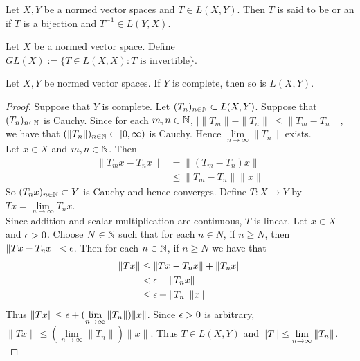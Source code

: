 \documentclass{book}
\begin{document}
	\begin{defn} 
		Let $X,Y$ be a normed vector spaces and $T \in L(X,Y)$. Then $T$ is said to be  or an  if $T$ is a bijection and $T^{-1} \in L(Y,X)$.
	\end{defn}
	
	\begin{defn} 
		Let $X$ be a normed vector space. Define $GL(X) := \{T \in L(X,X): T \text{ is invertible}\}$.
	\end{defn}
	
	\begin{ex} 
		Let $X,Y$ be normed vector spaces. If $Y$ is complete, then so is $L(X,Y)$.
	\end{ex}
	
	\begin{proof}
		Suppose that $Y$ is complete. Let $(T_n)_{n \in \mathbb{N}} \subset L(X,Y)$. Suppose that $(T_n)_{n \in \mathbb{N}}$ is Cauchy. Since for each $m,n \in \mathbb{N}$, $\big\vert \|T_m \|- \|T_n \|\big\vert \leq \|T_m -T_n \|$, we have that $(\|T_n \|)_{n \in \mathbb{N}} \subset [0,\infty)$ is Cauchy. Hence $\lim\limits_{n \rightarrow \infty}\|T_n \|$ exists. \vspace{1cm} \\ Let $x \in X$ and $m,n \in \mathbb{N}$. Then 
		\begin{align*}
			\|T_m x - T_n x \|
			&= \|(T_m-T_n) x \|\\
			&\leq \|T_m-T_n \|\|x \|
		\end{align*}
		So $(T_nx)_{n \in \mathbb{N}} \subset Y$ is Cauchy and hence converges. Define $T:X \rightarrow Y$ by $Tx = \lim\limits_{n \rightarrow \infty} T_nx$. \vspace{1cm}\\
		Since addition and scalar multiplication are continuous, $T$ is linear. Let $x \in X$ and $\epsilon>0$. Choose $N \in \mathbb{N}$ such that for each $n \in N$, if $n \geq N$, then $\|Tx - T_n x\|< \epsilon$. Then for each $n \in \mathbb{N}$, if $n \geq N$ we have that 
		\begin{align*}
			\|Tx\|
			&\leq \|Tx-T_nx \|+ \|T_nx \|\\
			&< \epsilon + \|T_nx \|\\
			&\leq \epsilon + \|T_n \|\|x \|
		\end{align*}  
		Thus $\|Tx \|\leq \epsilon +(\lim\limits_{n \rightarrow \infty} \|T_n \|) \|x \|$. Since $\epsilon >0$ is arbitrary, $\|Tx \|\leq (\lim\limits_{n \rightarrow \infty} \|T_n \|) \|x \|$. Thus $T \in L(X,Y)$ and $\|T \|\leq \lim \limits_{n \rightarrow \infty} \|T_n \|$. \vspace{1cm} \\

\end{proof}
\end{document}
